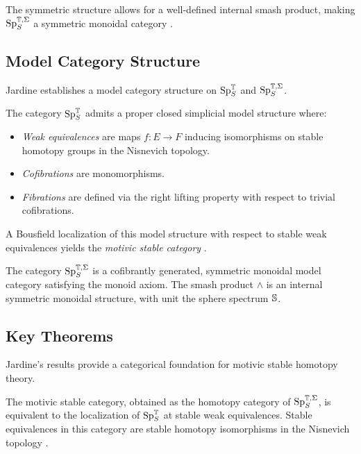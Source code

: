 \documentclass{article}
\begin{document}
\begin{remark}
The symmetric structure allows for a well-defined internal smash product, making \( \text{Sp}^{\mathbb{T}, \Sigma}_S \) a symmetric monoidal category \cite{Jardine2000MotivicSS}.
\end{remark}

\subsection{Model Category Structure}

Jardine establishes a model category structure on \( \text{Sp}^{\mathbb{T}}_S \) and \( \text{Sp}^{\mathbb{T}, \Sigma}_S \).

\begin{theorem}
The category \( \text{Sp}^{\mathbb{T}}_S \) admits a proper closed simplicial model structure where:
\begin{itemize}
    \item \emph{Weak equivalences} are maps \( f: E \to F \) inducing isomorphisms on stable homotopy groups in the Nisnevich topology.
    \item \emph{Cofibrations} are monomorphisms.
    \item \emph{Fibrations} are defined via the right lifting property with respect to trivial cofibrations.
\end{itemize}
A Bousfield localization of this model structure with respect to stable weak equivalences yields the \emph{motivic stable category} \cite{Jardine2000MotivicSS}.
\end{theorem}

\begin{theorem}
The category \( \text{Sp}^{\mathbb{T}, \Sigma}_S \) is a cofibrantly generated, symmetric monoidal model category satisfying the monoid axiom. The smash product \( \wedge \) is an internal symmetric monoidal structure, with unit the sphere spectrum \( \mathbb{S} \).
\end{theorem}

\subsection{Key Theorems}

Jardine’s results provide a categorical foundation for motivic stable homotopy theory.

\begin{theorem}
The motivic stable category, obtained as the homotopy category of \( \text{Sp}^{\mathbb{T}, \Sigma}_S \), is equivalent to the localization of \( \text{Sp}^{\mathbb{T}}_S \) at stable weak equivalences. Stable equivalences in this category are stable homotopy isomorphisms in the Nisnevich topology \cite{Jardine2000MotivicSS}.
\end{theorem}
\end{document}
